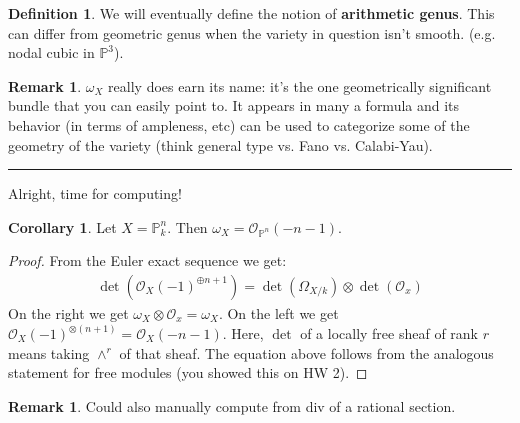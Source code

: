 \documentclass[10pt,reqno]{amsart}
\theoremstyle{definition}
\newtheorem{corollary}[theorem]{Corollary}
\newtheorem{definition}[theorem]{Definition}
\newtheorem{remark}[theorem]{Remark}
\theoremstyle{remark}
\numberwithin{equation}{section}
\numberwithin{theorem}{section}
\newcommand*{\red}{\textcolor{red}}
\newcommand{\OO}{{\mathcal O}}
\newcommand{\PP}{{\mathbb P}}
\begin{document}
\begin{definition} We will eventually define the notion of \textbf{arithmetic genus}. This can differ from geometric genus when the variety in question isn't smooth. (e.g. nodal cubic in $\PP^3$).
\end{definition}

\begin{remark} $\omega_X$ really does earn its name: it's the one geometrically significant bundle that you can easily point to. It appears in many a formula and its behavior (in terms of ampleness, etc) can be used to categorize some of the geometry of the variety (think general type vs. Fano vs. Calabi-Yau).
\end{remark}

\hrule
\vspace{1em}

Alright, time for computing!


\begin{corollary} Let $X = \PP^n_k$. Then $\omega_{X} = \OO_{\PP^n}(-n-1)$.
\end{corollary}
\begin{proof}
From the Euler exact sequence we get:
\begin{align*}
\det(\OO_X(-1)^{\oplus n+1}) = \det(\Omega_{X/k}) \otimes \det(\OO_x) 
\end{align*}
On the right we get $\omega_{X} \otimes \OO_x = \omega_X$. On the left we get $\OO_X(-1)^{\otimes (n+1)} = \OO_X(-n-1)$. Here, $\det$ of a locally free sheaf of rank $r$ means taking $\wedge^r$ of that sheaf. The equation above follows from the analogous statement for free modules (you showed this on HW 2).
\end{proof}

\begin{remark} Could also manually compute from div of a rational section. %
\end{remark}
\end{document}
